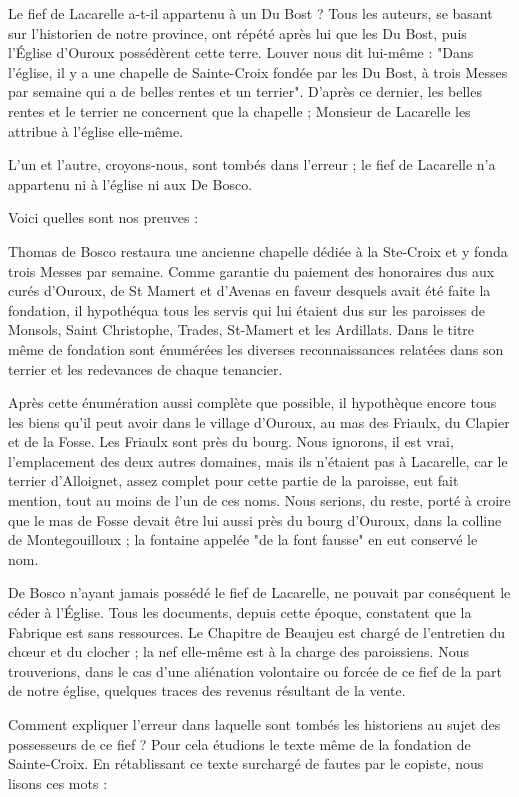 Le fief de Lacarelle a-t-il appartenu à un Du Bost ? Tous les auteurs, se basant sur l'historien de notre province, ont répété après lui que les Du Bost, puis l'Église d'Ouroux possédèrent cette terre. Louver nous dit lui-même : "Dans l'église, il y a une chapelle de Sainte-Croix fondée par les Du Bost, à trois Messes par semaine qui a de belles rentes et un terrier". D'après ce dernier, les belles rentes et le terrier ne concernent que la chapelle ; Monsieur de Lacarelle les attribue à l'église elle-même.

L'un et l'autre, croyons-nous, sont tombés dans l'erreur ; le fief de Lacarelle n'a appartenu ni à l'église ni aux De Bosco.

Voici quelles sont nos preuves :

Thomas de Bosco restaura une ancienne chapelle dédiée à la Ste-Croix et y fonda trois Messes par semaine. Comme garantie du paiement des honoraires dus aux curés d'Ouroux, de St Mamert et d'Avenas en faveur desquels avait été faite la fondation, il hypothéqua tous les servis qui lui étaient dus sur les paroisses de Monsols, Saint
Christophe, Trades, St-Mamert et les Ardillats. Dans le titre même de fondation sont énumérées les diverses reconnaissances relatées dans son terrier et les redevances de chaque tenancier.

Après cette énumération aussi complète que possible, il hypothèque encore tous les biens qu'il peut avoir dans le village d'Ouroux, au mas des Friaulx, du Clapier et de la Fosse. Les Friaulx sont près du bourg. Nous ignorons, il est vrai, l'emplacement des deux autres domaines, mais ils n'étaient pas à Lacarelle, car le terrier d'Alloignet, assez complet pour cette partie de la paroisse, eut fait mention, tout au moins de l'un de ces noms. Nous serions, du reste, porté à croire que le mas de Fosse devait être lui aussi près du bourg d'Ouroux, dans la colline de Montegouilloux ; la fontaine appelée "de la font fausse" en eut conservé le nom.

De Bosco n'ayant jamais possédé le fief de Lacarelle, ne pouvait par conséquent le céder à l'Église. Tous les documents, depuis cette époque, constatent que la Fabrique est sans ressources. Le Chapitre de Beaujeu est chargé de l'entretien du chœur et du clocher ; la nef elle-même est à la charge des paroissiens. Nous trouverions, dans le cas d'une aliénation volontaire ou forcée de ce fief de la part de notre église, quelques traces des revenus résultant de la vente.

Comment expliquer l'erreur dans laquelle sont tombés les historiens au sujet des possesseurs de ce fief ? Pour cela étudions le texte même de la fondation de Sainte-Croix. En rétablissant ce texte surchargé de fautes par le copiste, nous lisons ces mots :

